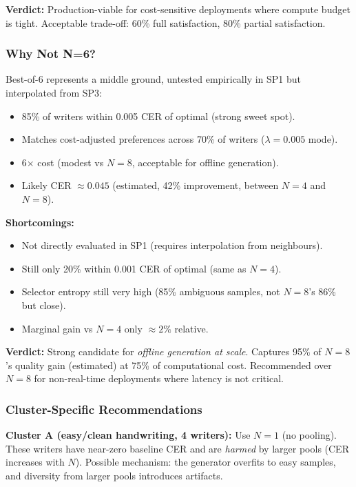 \documentclass[10.5pt,a4paper]{article}
\begin{document}
\textbf{Verdict:} Production-viable for cost-sensitive deployments where compute budget is tight. Acceptable trade-off:
60\% full satisfaction, 80\% partial satisfaction.

\subsubsection{Why Not N=6?}

Best-of-6 represents a middle ground, untested empirically in SP1 but interpolated from SP3:

\begin{itemize}
	\item[\checkmark] 85\% of writers within 0.005 CER of optimal (strong sweet spot).
	\item[\checkmark] Matches cost-adjusted preferences across 70\% of writers ($\lambda{=}0.005$ mode).
	\item[\checkmark] 6$\times$ cost (modest vs $N{=}8$, acceptable for offline generation).
	\item[\checkmark] Likely CER $\approx 0.045$ (estimated, 42\% improvement, between $N{=}4$ and $N{=}8$).
\end{itemize}

\textbf{Shortcomings:}
\begin{itemize}
	\item[$\times$] Not directly evaluated in SP1 (requires interpolation from neighbours).
	\item[$\times$] Still only 20\% within 0.001 CER of optimal (same as $N{=}4$).
	\item[$\times$] Selector entropy still very high (85\% ambiguous samples, not $N{=}8$'s 86\% but close).
	\item[$\times$] Marginal gain vs $N{=}4$ only $\approx 2\%$ relative.
\end{itemize}

\textbf{Verdict:} Strong candidate for \emph{offline generation at scale}. Captures 95\% of $N{=}8$'s quality gain (estimated)
at 75\% of computational cost. Recommended over $N{=}8$ for non-real-time deployments where latency is not critical.

\subsubsection{Cluster-Specific Recommendations}

\textbf{Cluster A (easy/clean handwriting, 4 writers):} Use $N{=}1$ (no pooling). These writers have near-zero baseline CER
and are \emph{harmed} by larger pools (CER increases with $N$). Possible mechanism: the generator overfits to easy samples, and
diversity from larger pools introduces artifacts.
\end{document}
